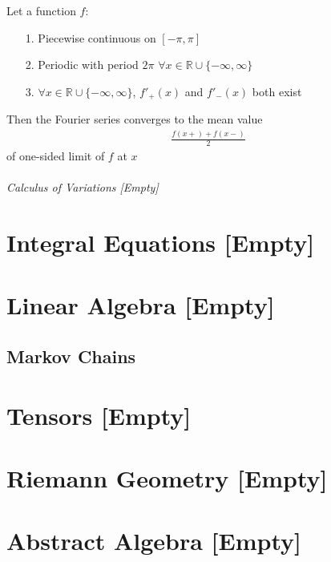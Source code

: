 \documentclass[12pt, english]{book}
\begin{document}
	\begin{theorem}
		\label{Fourier Theorem - PDE}
		Let a function \(f\):
		\begin{itemize}
			\item[1.] Piecewise continuous on \([-\pi,\pi]\)
			\item[2.] Periodic with period \(2\pi\) \(\forall x \in \mathbb{R} \cup \{-\infty,\infty\}\)
			\item[3.] \(\forall x \in \mathbb{R} \cup \{-\infty,\infty\}\), \(f'_{+}(x)\) and \(f'_{-}(x)\) both exist 
		\end{itemize}
		Then the Fourier series converges to the mean value
		\begin{align*}
			\frac{f(x+) + f(x-)}{2}
		\end{align*}
		of one-sided limit of \(f\) at \(x\)
	\end{theorem}
	
	\paragraph{Calculus of Variations [Empty]} \label{Calculus of Variations Part}
	
	\part{Integral Equations [Empty]} \label{Integral Equations Part}
	
	
	\part{Linear Algebra [Empty]} \label{Linear Algebra Part}
	
	\chapter{Markov Chains} \label{Markov Chains Chapter - Linear Algebra}
	
	
	\part{Tensors [Empty]} \label{Tensors Part}
	
	
	\part{Riemann Geometry [Empty]} \label{Reimann Geometry Part}
	
	
	\part{Abstract Algebra [Empty]} \label{Abstract Algebra Part}
	
\end{document}

